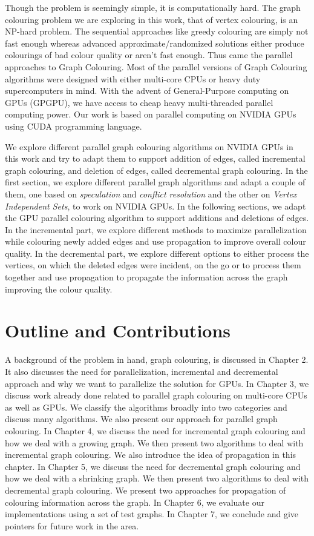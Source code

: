 \documentclass[MTech]{iitmdiss}
\begin{document}
Though the problem is seemingly simple, it is computationally hard. The graph colouring problem we are exploring in this work, that of vertex colouring, is an NP-hard problem. The sequential approaches like greedy colouring are simply not fast enough whereas advanced approximate/randomized solutions either produce colourings of bad colour quality or aren't fast enough. Thus came the parallel approaches to Graph Colouring. Most of the parallel versions of Graph Colouring algorithms were designed with either multi-core CPUs or heavy duty supercomputers in mind. With the advent of General-Purpose computing on GPUs (GPGPU), we have access to cheap heavy multi-threaded parallel computing power. Our work is based on parallel computing on NVIDIA GPUs using CUDA programming language.

We explore different parallel graph colouring algorithms on NVIDIA GPUs in this work and try to adapt them to support addition of edges, called incremental graph colouring, and deletion of edges, called decremental graph colouring. In the first section, we explore different parallel graph algorithms and adapt a couple of them, one based on \textit{speculation} and \textit{conflict resolution} and the other on \textit{Vertex Independent Sets}, to work on NVIDIA GPUs. In the following sections, we adapt the GPU parallel colouring algorithm to support additions and deletions of edges. In the incremental part, we explore different methods to maximize parallelization while colouring newly added edges and use propagation to improve overall colour quality. In the decremental part, we explore different options to either process the vertices, on which the deleted edges were incident, on the go or to process them together and use propagation to propagate the information across the graph improving the colour quality. 

\section{Outline and Contributions}
A background of the problem in hand, graph colouring, is discussed in Chapter 2. It also discusses the need for parallelization, incremental and decremental approach and why we want to parallelize the solution for GPUs. In Chapter 3, we discuss work already done related to parallel graph colouring on multi-core CPUs as well as GPUs. We classify the algorithms broadly into two categories and discuss many algorithms. We also present our approach for parallel graph colouring. In Chapter 4, we discuss the need for incremental graph colouring and how we deal with a growing graph. We then present two algorithms to deal with incremental graph colouring. We also introduce the idea of propagation in this chapter. In Chapter 5, we discuss the need for decremental graph colouring and how we deal with a shrinking graph. We then present two algorithms to deal with decremental graph colouring. We present two approaches for propagation of colouring information across the graph. In Chapter 6, we evaluate our implementations using a set of test graphs. In Chapter 7, we conclude and give pointers for future work in the area.
\end{document}
